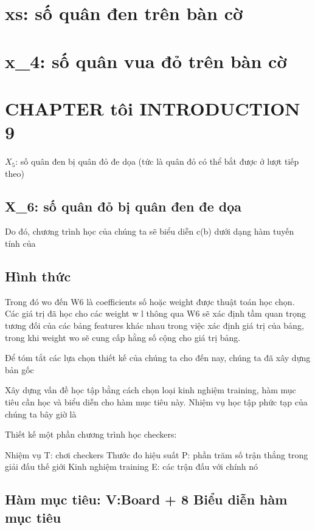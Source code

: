 \section{xs: số quân đen trên bàn cờ}

\section{x\_4: số quân vua đỏ trên bàn cờ}

\section{CHAPTER tôi INTRODUCTION 9}

$X_{5}$: số quân đen bị quân đỏ đe dọa (tức là quân đỏ có thể bắt được ở lượt tiếp theo)

\subsection{X\_6: số quân đỏ bị quân đen đe dọa}

Do đó, chương trình học của chúng ta sẽ biểu diễn c(b) dưới dạng hàm tuyến tính của

\subsection{Hình thức}

Trong đó wo đến W6 là coefficients số hoặc weight được thuật toán học chọn. Các giá trị đã học cho các weight w l thông qua W6 sẽ xác định tầm quan trọng tương đối của các bảng features khác nhau trong việc xác định giá trị của bảng, trong khi weight wo sẽ cung cấp hằng số cộng cho giá trị bảng.

Để tóm tắt các lựa chọn thiết kế của chúng ta cho đến nay, chúng ta đã xây dựng bản gốc

Xây dựng vấn đề học tập bằng cách chọn loại kinh nghiệm training, hàm mục tiêu cần học và biểu diễn cho hàm mục tiêu này. Nhiệm vụ học tập phức tạp của chúng ta bây giờ là

Thiết kế một phần chương trình học checkers:

Nhiệm vụ T: chơi checkers Thước đo hiệu suất P: phần trăm số trận thắng trong giải đấu thế giới Kinh nghiệm training E: các trận đấu với chính nó

\subsection{Hàm mục tiêu: V:Board + 8 Biểu diễn hàm mục tiêu}

